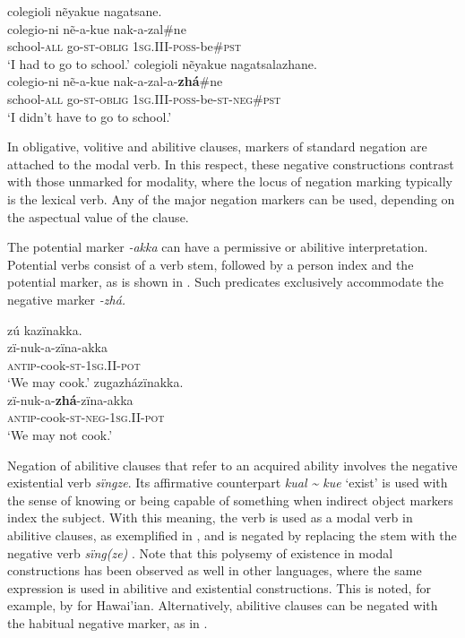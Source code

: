 \documentclass[output=paper,colorlinks,citecolor=brown]{langscibook}
\begin{document}
\ea\label{ex:kog:17}
    \ea\label{ex:kog:17a}colegioli nẽyakue nagatsane.\\
        \gll  colegio-ni nẽ-a-kue nak-a-zal\#ne\\ 
              school-\textsc{all} go\textsc{-st-oblig} \textsc{1sg.III{}-poss-}be\#\textsc{pst}\\
        \glt  ‘I had to go to school.’
    \ex\label{ex:kog:17b}colegioli nẽyakue nagatsalazhane.\\
        \gll  colegio-ni nẽ{}-a-kue nak-a-zal{}-a-\textbf{zhá}\#ne\\
              school-\textsc{all} go\textsc{-st-oblig} \textsc{1sg.III{}-poss-}be{}-\textsc{st{}-neg}\#\textsc{pst}\\
        \glt ‘I didn't have to go to school.’
    \z
\z 

In obligative, volitive and abilitive clauses, markers of standard negation are attached to the modal verb. In this respect, these negative constructions contrast with those unmarked for modality, where the locus of negation marking typically is the lexical verb. Any of the major negation markers can be used, depending on the aspectual value of the clause.

The potential marker \textit{{}-akka} can have a permissive or abilitive interpretation. Potential verbs consist of a verb stem, followed by a person index and the potential marker, as is shown in . Such predicates exclusively accommodate the negative marker \textit{{}-zhá.}

\ea\label{ex:kog:18}
    \ea\label{ex:kog:18a}zú kazïnakka.\\
        \gll  zï{}-nuk{}-a-zïna-akka\\ 
              \textsc{antip{}-}cook\textsc{{}-st-1sg.II{}-pot}\\
        \glt ‘We may cook.’
    \ex\label{ex:kog:18b}zugazházïnakka.\\
        \gll  zï{}-nuk{}-a-\textbf{zhá}-zïna-akka\\
              \textsc{antip{}-}cook\textsc{{}-st-neg-1sg.II{}-pot}\\
        \glt  ‘We may not cook.’
    \z
\z 

Negation of abilitive clauses that refer to an acquired ability involves the negative existential verb \textit{sïngze}. Its affirmative counterpart \textit{kual {\textasciitilde} kue} ‘exist’ is used with the sense of knowing or being capable of something when indirect object markers index the subject. With this meaning, the verb is used as a modal verb in abilitive clauses, as exemplified in , and is negated by replacing the stem with the negative verb \textit{sïng(ze)} . Note that this polysemy of existence in modal constructions has been observed as well in other languages, where the same expression is used in abilitive and existential constructions. This is noted, for example, by \citet{Veselinova2013neg.exist} for Hawai’ian. Alternatively, abilitive clauses can be negated with the habitual negative marker, as in .
\end{document}
